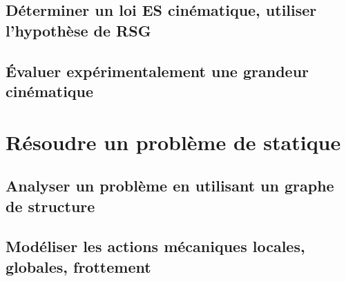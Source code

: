 \graphicspath{{\repStyle/png/}{../CIN/CIN-03-Transmetteurs/38_Treuil/images/}} 
 
 
\graphicspath{{\repStyle/png/}{../CIN/CIN-03-Transmetteurs/91_PorteAvion/images/}} 
 
 
\graphicspath{{\repStyle/png/}{../CIN/CIN-03-Transmetteurs/92_Colossus/images/}} 
 
 
\graphicspath{{\repStyle/png/}{../CIN/CIN-03-Transmetteurs/93_Lokomat/images/}} 
 
 
\graphicspath{{\repStyle/png/}{../CIN/CIN-03-Transmetteurs/94_Taurus/images/}} 
 
 
\section{Déterminer un loi ES cinématique, utiliser l'hypothèse de RSG} 
\section{Évaluer expérimentalement une grandeur cinématique} 
\setchapterpreamble[u]{\margintoc} 
\chapter{Résoudre un problème de statique} 
\section{Analyser un problème en utilisant un graphe de structure} 
\section{Modéliser les actions mécaniques locales, globales, frottement} 
\graphicspath{{\repStyle/png/}{../STAT/STAT-02-Frottement/532_MAM_Frottement_Cylindre/images/}} 
 
 
\graphicspath{{\repStyle/png/}{../STAT/STAT-02-Frottement/533_MAM_Frottement_Cylindre/images/}} 
 
 
\graphicspath{{\repStyle/png/}{../STAT/STAT-02-Global/516_MAM/images/}} 
 
 
